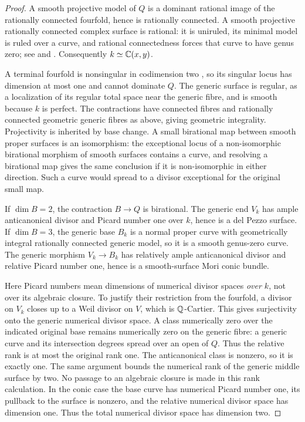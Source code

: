 \begin{proof}
A smooth projective model of $Q$ is a dominant rational image of the
rationally connected fourfold, hence is rationally connected.  A
smooth projective rationally connected complex surface is rational:
it is uniruled, its minimal model is ruled over a curve, and rational
connectedness forces that curve to have genus zero; see
\cite[Theorem~30]{AraujoKollar02} and \cite[Theorem~V.1]{Beauville78}.  Consequently
$k\simeq\mathbb C(x,y)$.

A terminal fourfold is nonsingular in codimension two
\cite[Exercise~4.9.1.1]{KollarFlips057}, so its
singular locus has dimension at most one and cannot dominate $Q$.
The generic surface is regular, as a localization of its regular
total space near the generic fibre, and is smooth because $k$ is
perfect.  The contractions have connected fibres and rationally
connected geometric generic fibres as above, giving geometric
integrality.  Projectivity is inherited by base change.  A small
birational map between smooth proper surfaces is an isomorphism:
the exceptional locus of a non-isomorphic birational morphism of
smooth surfaces contains a curve, and resolving a birational map
gives the same conclusion if it is non-isomorphic in either
direction.  Such a curve would spread to a divisor exceptional for
the original small map.

If $\dim B=2$, the contraction $B\to Q$ is birational.  The generic
end $V_k$ has ample anticanonical divisor and Picard number one over
$k$, hence is a del Pezzo surface.  If $\dim B=3$, the generic base
$B_k$ is a normal proper curve with geometrically integral
rationally connected generic model, so it is a smooth genus-zero
curve.  The generic morphism $V_k\to B_k$ has relatively ample
anticanonical divisor and relative Picard number one, hence is a
smooth-surface Mori conic bundle.

Here Picard numbers mean dimensions of numerical divisor spaces
\emph{over $k$}, not over its algebraic closure.  To justify their
restriction from the fourfold, a divisor on $V_k$ closes up to a
Weil divisor on $V$, which is $\mathbb Q$-Cartier.  This gives surjectivity
onto the generic numerical divisor space.  A class numerically zero
over the indicated original base remains numerically zero on the
generic fibre: a generic curve and its intersection degrees spread
over an open of $Q$.  Thus the relative rank is at most the original
rank one.  The anticanonical class is nonzero, so it is exactly one.
The same argument bounds the numerical rank of the generic middle
surface by two.  No passage to an algebraic closure is made in this
rank calculation.
In the conic case the base curve has numerical Picard number one,
its pullback to the surface is nonzero, and the relative numerical
divisor space has dimension one.  Thus the total numerical divisor
space has dimension two.
\end{proof}

